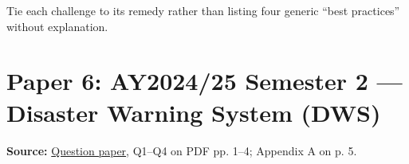 Tie each challenge to its remedy rather than listing four generic ``best practices'' without explanation.


\par\Needspace{120pt}\medskip
\section*{Paper 6: AY2024/\allowbreak{}25 Semester 2 --- Disaster Warning System (DWS)}\label{paper-2425-s2}
\textbf{Source:} \href{run:/Users/bryangoh/Work/ntu-cs/sc2006/pyps/SC2006\_AY2425\_S2\_Questions.pdf}{Question paper}, Q1--Q4 on PDF pp. 1--4; Appendix A on p. 5.




